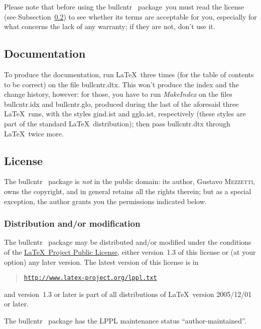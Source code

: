 \documentclass[a4paper]{article}
\DeclareRobustCommand*{\packlass}[1]{%
	{\texorpdfstring{\normalfont \sffamily}{}#1}%
}
\DeclareRobustCommand*{\filedir}[1]{{\normalfont\ttfamily #1}}
\newcommand*{\Bullcntr}{bullcntr}
\newcommand*{\bull}{\packlass{\Bullcntr}}
\newcommand*{\tbull}{the \bull\ package}
\newcommand*{\hreff}[1]{\href{#1}{\texttt{#1}}}
\begin{document}
Please note that before using \tbull\ you must read the license (see
Subsection~\ref{SS:License}) to see whether its terms are acceptable
for you, especially for what concerns the lack of any warranty; if
they are not, don't use it.



\subsection{Documentation}

To produce the documentation, run \LaTeX\ three times (for the table
of contents to be correct) on the file \filedir{\Bullcntr.dtx}.  This
won't produce the index and the change history, however: for those,
you have to run \emph{MakeIndex} on the files \filedir{\Bullcntr.idx}
and \filedir{\Bullcntr.glo}, produced during the last of the aforesaid
three \LaTeX\ runs, with the styles \filedir{gind.ist} and
\filedir{gglo.ist}, respectively (these styles are part of the
standard \LaTeX\ distribution); then pass \filedir{\Bullcntr.dtx}
through \LaTeX\ twice more.



\subsection{License}
\label{SS:License}

The \bull\ package is \emph{not} in the public domain: its author,
Gustavo \textsc{Mezzetti}, owns the copyright, and in general retains
all the rights therein; but as a special exception, the author grants
you the permissions indicated below.



\subsubsection{Distribution and/or modification}

The \bull\ package may be distributed and/or modified under the
conditions of the \href{http://www.latex-project.org/lppl.txt}{\LaTeX\
Project Public License}, either version~1.3 of this license or (at
your option) any later version.  The latest version of this license is
in
%
\begin{quote}
	\hreff{http://www.latex-project.org/lppl.txt}
\end{quote}
%
and version~1.3 or later is part of all distributions of \LaTeX\
version 2005/12/01 or later.

The \bull\ package has the LPPL maintenance status
``author-maintained''.
\end{document}
